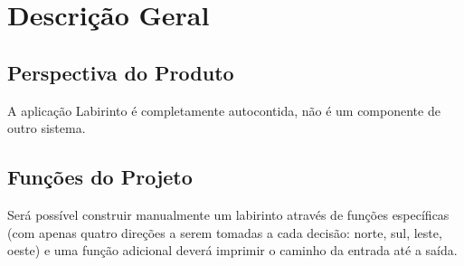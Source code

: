 \chapter{Descrição Geral}

\section{Perspectiva do Produto}
A aplicação Labirinto é completamente autocontida, não é um componente de outro sistema.

\section{Funções do Projeto}
Será possível construir manualmente um labirinto através de funções específicas (com apenas quatro direções a serem tomadas a cada decisão: norte, sul, leste, oeste) e uma função adicional deverá imprimir o caminho da entrada até a saída.


